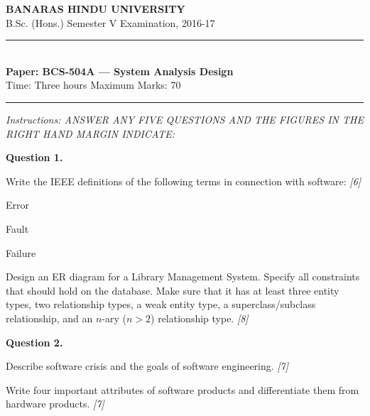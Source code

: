 \documentclass[11pt,a4paper]{article}
\newcommand{\pts}[1]{\hfill   \textit{[#1]}}
\begin{document}
\begin{center}
  {\large\bfseries BANARAS HINDU UNIVERSITY}\\[2pt]
  {\normalsize B.Sc. (Hons.) Semester V Examination, 2016-17}\\[6pt]
  \rule{0.8\linewidth}{0.5pt}\\[6pt]
  {\large\bfseries Paper: BCS-504A --- System Analysis Design}\\[4pt]
  {\normalsize Time: Three hours \hfill Maximum Marks: 70}
\end{center}

\rule{\linewidth}{0.4pt}

\smallskip



\noindent   \textit{Instructions: ANSWER ANY FIVE QUESTIONS AND THE FIGURES IN THE RIGHT HAND MARGIN INDICATE:}

\bigskip

\medskip


\noindent   \textbf{Question 1.}

\begin{parts}
  \item Write the IEEE definitions of the following terms in connection with software: \pts{6}
  
\begin{parts}
    \item Error
    \item Fault
    \item Failure
  \end{parts}
  \item Design an ER diagram for a Library Management System. Specify all constraints that should hold on the database. Make sure that it has at least three entity types, two relationship types, a weak entity type, a superclass/subclass relationship, and an $n$-ary ($n > 2$) relationship type. \pts{8}
\end{parts}

\medskip


\noindent   \textbf{Question 2.}

\begin{parts}
  \item Describe software crisis and the goals of software engineering. \pts{7}
  \item Write four important attributes of software products and differentiate them from hardware products. \pts{7}
\end{parts}

\medskip
\end{document}
